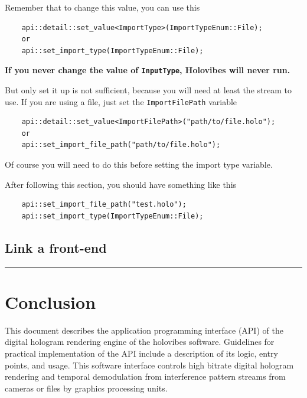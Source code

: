 \documentclass[
 reprint,
 superscriptaddress,
 amsmath,
 amssymb,
 aps,
]{revtex4-2}
\begin{document}
Remember that to change this value, you can use this
\begin{lstlisting}
    api::detail::set_value<ImportType>(ImportTypeEnum::File);
    or
    api::set_import_type(ImportTypeEnum::File);
\end{lstlisting}

\textbf{If you never change the value of \texttt{InputType}, Holovibes will never run.}

But only set it up is not sufficient, because you will need at least the stream to use.
If you are using a file, just set the \verb|ImportFilePath| variable
\begin{lstlisting}
    api::detail::set_value<ImportFilePath>("path/to/file.holo");
    or
    api::set_import_file_path("path/to/file.holo");
\end{lstlisting}

Of course you will need to do this before setting the import type variable.


After following this section, you should have something like this
\begin{lstlisting}
    api::set_import_file_path("test.holo");
    api::set_import_type(ImportTypeEnum::File);
\end{lstlisting}

\subsection{Link a front-end}


\noindent\rule[0.5ex]{\linewidth}{1pt}
\hfill
\twocolumngrid

\section{Conclusion}

This document describes the application programming interface (API) of the digital hologram rendering engine of the holovibes software. Guidelines for practical implementation of the API include a description of its logic, entry points, and usage. This software interface controls high bitrate digital hologram rendering and temporal demodulation from interference pattern streams from cameras or files by graphics processing units.\\
\end{document}
